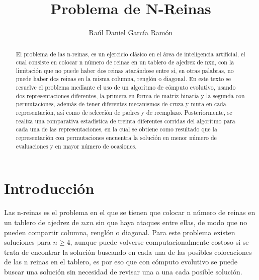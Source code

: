 \documentclass[runningheads]{llncs}
\begin{document}
%
\title{Problema de N-Reinas}
%
%
\author{Raúl Daniel García Ramón}
%

%
%
\maketitle              %
%
\begin{abstract}
El problema de las n-reinas, es un ejercicio clásico en el área de inteligencia artificial, el cual consiste en colocar n número de reinas en un tablero de ajedrez de nxn, con la limitación que no puede haber dos reinas atacándose entre sí, en otras palabras, no puede haber dos reinas en la misma columna, renglón o diagonal. En este texto se resuelve el problema mediante el uso de un algoritmo de cómputo evolutivo, usando dos representaciones diferentes, la primera en forma de matriz binaria y la segunda con permutaciones, además de tener diferentes mecanismos de cruza y muta en cada representación, así como de selección de padres y de reemplazo. Posteriormente, se realiza una comparativa estadística de treinta diferentes corridas del algoritmo para cada una de las representaciones, en la cual se obtiene como resultado que la representación con permutaciones encuentra la solución en menor número de evaluaciones y en mayor número de ocasiones.

\end{abstract}
%
%
%
\section{Introducción}
Las n-reinas es el problema en el que se tienen que colocar n número de reinas en un tablero de ajedrez de $nxn$ sin que haya ataques entre ellas, de modo que no pueden compartir columna, renglón o diagonal. Para este problema existen soluciones para $n\geq4$, aunque puede volverse computacionalmente costoso si se trata de encontrar la solución buscando en cada una de las posibles colocaciones de las n reinas en el tablero, es por eso que con cómputo evolutivo se puede buscar una solución sin necesidad de revisar una a una cada posible solución.
\end{document}
